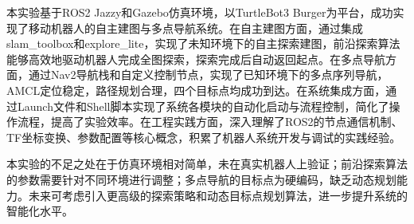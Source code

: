 \documentclass[a4paper,12pt]{article}
\begin{document}
本实验基于ROS2 Jazzy和Gazebo仿真环境，以TurtleBot3 Burger为平台，成功实现了移动机器人的自主建图与多点导航系统。在自主建图方面，通过集成slam\_toolbox和explore\_lite，实现了未知环境下的自主探索建图，前沿探索算法能够高效地驱动机器人完成全图探索，探索完成后自动返回起点。在多点导航方面，通过Nav2导航栈和自定义控制节点，实现了已知环境下的多点序列导航，AMCL定位稳定，路径规划合理，四个目标点均成功到达。在系统集成方面，通过Launch文件和Shell脚本实现了系统各模块的自动化启动与流程控制，简化了操作流程，提高了实验效率。在工程实践方面，深入理解了ROS2的节点通信机制、TF坐标变换、参数配置等核心概念，积累了机器人系统开发与调试的实践经验。

本实验的不足之处在于仿真环境相对简单，未在真实机器人上验证；前沿探索算法的参数需要针对不同环境进行调整；多点导航的目标点为硬编码，缺乏动态规划能力。未来可考虑引入更高级的探索策略和动态目标点规划算法，进一步提升系统的智能化水平。
\end{document}
